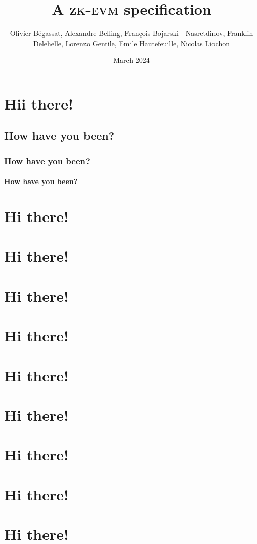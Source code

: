\documentclass[fleqn]{report}
\title{A \textsc{zk-evm} specification}
\author{%
Olivier Bégassat,
Alexandre Belling,
François Bojarski - Nasretdinov,
Franklin Delehelle,
Lorenzo Gentile,
Emile Hautefeuille,
Nicolas Liochon
}
\date{March 2024}
\begin{document}
\maketitle
\tableofcontents


\chapter{Hii there!}
\section{How have you been?}
\subsection{How have you been?}
\subsubsection{How have you been?}
\chapter{Hi there!}
\chapter{Hi there!}
\chapter{Hi there!}
\chapter{Hi there!}
\chapter{Hi there!}
\chapter{Hi there!}
\chapter{Hi there!}
\chapter{Hi there!}
\chapter{Hi there!}
\end{document}

